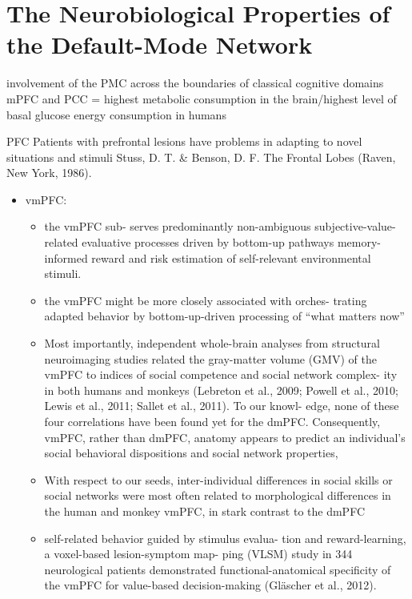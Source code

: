 \documentclass{article} %
\begin{document}
\section{The Neurobiological Properties of the Default-Mode Network}
 involvement of the PMC across the boundaries of classical cognitive domains
mPFC and PCC = highest metabolic consumption in the brain/highest level of basal glucose energy consumption in humans

PFC
Patients with prefrontal lesions have problems in adapting to novel situations and stimuli
Stuss, D. T. \& Benson, D. F. The Frontal Lobes (Raven, New York, 1986).


\begin{itemize}
  \item
    vmPFC:
    \begin{itemize}
    \item
the vmPFC sub- serves predominantly non-ambiguous subjective-value-related evaluative processes driven by bottom-up pathways
memory-informed reward and risk estimation of self-relevant environmental stimuli.
\item
the vmPFC might be more closely associated with orches- trating adapted behavior by bottom-up-driven processing of “what matters now”

\item
Most importantly, independent whole-brain analyses from structural neuroimaging studies related the gray-matter volume (GMV) of the vmPFC to indices of social competence and social network complex- ity in both humans and monkeys (Lebreton et al., 2009; Powell et al., 2010; Lewis et al., 2011; Sallet et al., 2011). To our knowl- edge, none of these four correlations have been found yet for the dmPFC. Consequently, vmPFC, rather than dmPFC, anatomy appears to predict an individual’s social behavioral dispositions and social network properties,

\item
With respect to our seeds, inter-individual differences in social skills or social networks were most often related to morphological differences in the human and monkey vmPFC, in stark contrast to the dmPFC

\item
self-related behavior guided by stimulus evalua- tion and reward-learning, a voxel-based lesion-symptom map- ping (VLSM) study in 344 neurological patients demonstrated functional-anatomical specificity of the vmPFC for value-based decision-making (Gläscher et al., 2012).



\end{itemize}
\end{itemize}
\end{document}
